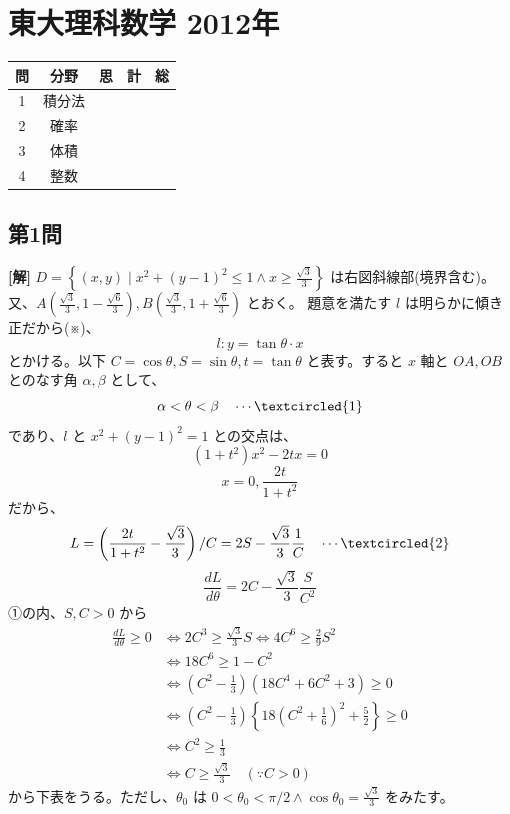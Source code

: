 \documentclass[../main.tex]{subfiles}
\begin{document}
\section*{東大理科数学 2012年}

\begin{center}
  \begin{tabular}{|c|c|c|c|c|}
    \hline
    問 & 分野 & 思 & 計 & 総 \\ \hline
    1 & 積分法 & & & \\ \hline
    2 & 確率 & & & \\ \hline
    3 & 体積 & & & \\ \hline
    4 & 整数 & & & \\ \hline
  \end{tabular}
\end{center}

\bigskip

\subsection*{第1問}

\noindent
\textbf{[解]} $D = \left\{ (x,y) \mid x^2+(y-1)^2 \le 1 \land x \ge \frac{\sqrt{3}}{3} \right\}$ は右図斜線部(境界含む)。
又、$A\left(\frac{\sqrt{3}}{3}, 1-\frac{\sqrt{6}}{3}\right), B\left(\frac{\sqrt{3}}{3}, 1+\frac{\sqrt{6}}{3}\right)$ とおく。
題意を満たす $l$ は明らかに傾き正だから(※)、
\[ l : y = \tan\theta \cdot x \]
とかける。以下 $C = \cos\theta, S = \sin\theta, t = \tan\theta$ と表す。すると $x$ 軸と $OA, OB$ とのなす角 $\alpha, \beta$ として、
\[ \alpha < \theta < \beta \quad \cdots \textcircled{1} \]
であり、$l$ と $x^2+(y-1)^2=1$ との交点は、
\[ (1+t^2)x^2 - 2tx = 0 \]
\[ x = 0, \frac{2t}{1+t^2} \]
だから、
\[ L = \left( \frac{2t}{1+t^2} - \frac{\sqrt{3}}{3} \right) / C = 2S - \frac{\sqrt{3}}{3}\frac{1}{C} \quad \cdots \textcircled{2} \]
\[ \frac{dL}{d\theta} = 2C - \frac{\sqrt{3}}{3}\frac{S}{C^2} \]
①の内、$S, C > 0$ から
\begin{align*}
  \frac{dL}{d\theta} \ge 0 &\iff 2C^3 \ge \frac{\sqrt{3}}{3}S \iff 4C^6 \ge \frac{2}{9}S^2 \\
  &\iff 18C^6 \ge 1-C^2 \\
  &\iff (C^2 - \frac{1}{3})(18C^4 + 6C^2 + 3) \ge 0 \\
  &\iff (C^2 - \frac{1}{3})\left\{ 18\left(C^2+\frac{1}{6}\right)^2 + \frac{5}{2} \right\} \ge 0 \\
  &\iff C^2 \ge \frac{1}{3} \\
  &\iff C \ge \frac{\sqrt{3}}{3} \quad (\because C>0)
\end{align*}
から下表をうる。ただし、$\theta_0$ は $0 < \theta_0 < \pi/2 \land \cos\theta_0 = \frac{\sqrt{3}}{3}$ をみたす。
\end{document}
